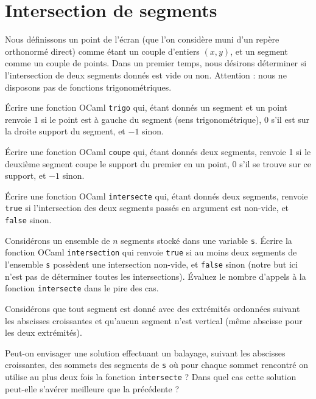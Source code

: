 \renewcommand{\SourceFile}{6-geometrie-et-images/src/6-6.ml}

\section{Intersection de segments}

Nous définissons un point de l'écran (que l'on considère muni d'un repère orthonormé direct) comme étant un couple d'entiers $(x,y)$, et un segment comme un couple de points. Dans un premier temps, nous désirons déterminer si l'intersection de deux segments donnés est vide ou non. Attention : nous ne disposons pas de fonctions trigonométriques.
\medskip

\Q
Écrire une fonction OCaml \texttt{trigo} qui, étant donnés un segment et un point renvoie 1 si le point est à gauche du segment (sens trigonométrique), 0 s'il est sur la droite support du segment, et $-1$ sinon.

\Q
Écrire une fonction OCaml \texttt{coupe} qui, étant donnés deux segments, renvoie 1 si le deuxième segment coupe le support du premier en un point, 0 s'il se trouve sur ce support, et $-1$ sinon.

\Q
Écrire une fonction OCaml \texttt{intersecte} qui, étant donnés deux segments, renvoie \texttt{true} si l'intersection des deux segments passés en argument est non-vide, et \texttt{false} sinon.

\Q
Considérons un ensemble de $n$ segments stocké dans une variable \texttt{s}. Écrire la fonction OCaml \texttt{intersection} qui renvoie \texttt{true} si au moins deux segments de l'ensemble \texttt{s} possèdent une intersection non-vide, et \texttt{false} sinon (notre but ici n'est pas de déterminer toutes les intersections). Évaluez le nombre d'appels à la fonction \texttt{intersecte} dans le pire des cas.

\Q
Considérons que tout segment est donné avec des extrémités ordonnées suivant les abscisses croissantes et qu'aucun segment n'est vertical (même abscisse pour les deux extrémités).
\medskip

Peut-on envisager une solution effectuant un balayage, suivant les abscisses croissantes, des sommets des segments de \texttt{s} où pour chaque sommet rencontré on utilise au plus deux fois la fonction \texttt{intersecte} ? Dans quel cas cette solution peut-elle s'avérer meilleure que la précédente ?

\Corrige
\vspace{.6cm}

